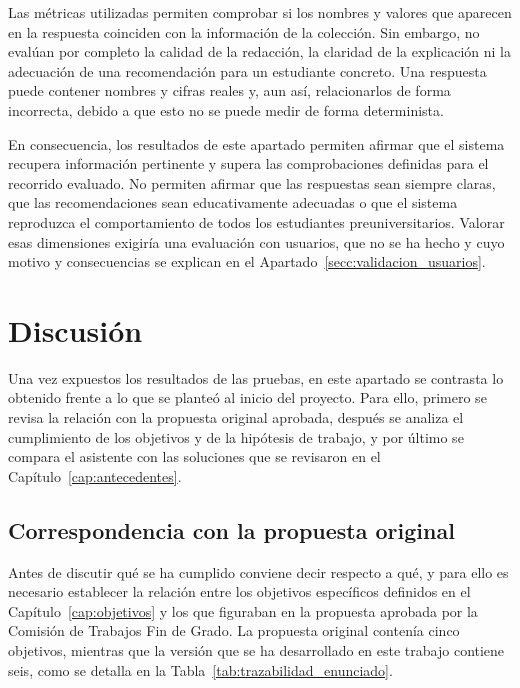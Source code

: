 Las métricas utilizadas permiten comprobar si los nombres
y valores que aparecen en la respuesta coinciden con la información de la
colección. Sin embargo, no evalúan por completo la calidad de la redacción, la
claridad de la explicación ni la adecuación de una recomendación para un
estudiante concreto. Una respuesta puede contener nombres y cifras reales y,
aun así, relacionarlos de forma incorrecta, debido a que esto no se puede medir de forma determinista.

En consecuencia, los resultados de este apartado permiten afirmar que el sistema recupera información pertinente y supera las comprobaciones definidas para el recorrido evaluado. No permiten afirmar que las respuestas sean siempre claras, que las recomendaciones sean
educativamente adecuadas o que el sistema reproduzca el comportamiento de todos los estudiantes preuniversitarios. Valorar esas dimensiones exigiría una evaluación con usuarios, que no se ha hecho y cuyo motivo y consecuencias se explican en el
Apartado~\ref{secc:validacion_usuarios}.

\section[Discusión]{Discusión}
\label{secc:discusion}

Una vez expuestos los resultados de las pruebas, en este apartado se contrasta lo obtenido frente a lo que se planteó al inicio del proyecto. Para ello, primero se revisa la relación con la propuesta original aprobada, después se analiza el cumplimiento de los objetivos y de la hipótesis de trabajo, y por último se compara el asistente con las soluciones que se revisaron en el Capítulo~\ref{cap:antecedentes}.

\subsection[Correspondencia con la propuesta original]{Correspondencia con la propuesta original}
\label{secc:discusion_correspondencia}

Antes de discutir qué se ha cumplido conviene decir respecto a qué, y para ello es necesario establecer la relación entre los objetivos específicos definidos en el Capítulo~\ref{cap:objetivos} y los que figuraban en la propuesta aprobada por la Comisión de Trabajos Fin de Grado. La propuesta original contenía cinco objetivos, mientras que la versión que se ha desarrollado en este trabajo contiene seis, como se detalla en la Tabla~\ref{tab:trazabilidad_enunciado}.


